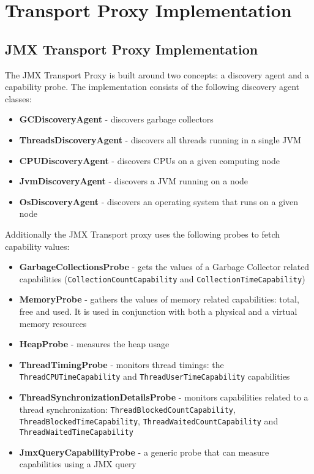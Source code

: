 \section{Transport Proxy Implementation}

\subsection{JMX Transport Proxy Implementation}

The JMX Transport Proxy is built around two concepts: a discovery agent and a capability probe. The implementation consists of the following discovery agent classes:

\begin{itemize} 
  \item{\bf{GCDiscoveryAgent}} - discovers garbage collectors 
  \item{\bf{ThreadsDiscoveryAgent}} - discovers all threads running in a single JVM
  \item{\bf{CPUDiscoveryAgent}} - discovers CPUs on a given computing node
  \item{\bf{JvmDiscoveryAgent}} - discovers a JVM running on a node
  \item{\bf{OsDiscoveryAgent}} - discovers an operating system that runs on a given node
\end{itemize} 

Additionally the JMX Transport proxy uses the following probes to fetch capability values: 

\begin{itemize} 
  \item{\bf{GarbageCollectionsProbe}} - gets the values of a Garbage Collector related capabilities (\texttt{CollectionCountCapability} and \texttt{CollectionTimeCapability})
  \item{\bf{MemoryProbe}} - gathers the values of memory related capabilities: total, free and used. It is used in conjunction with both a physical and a virtual memory resources
  \item{\bf{HeapProbe}} - measures the heap usage  
  \item{\bf{ThreadTimingProbe}} - monitors thread timings: the \texttt{ThreadCPUTimeCapability} and \texttt{ThreadUserTimeCapability} capabilities
  \item{\bf{ThreadSynchronizationDetailsProbe}} - monitors capabilities related to a thread synchronization: \texttt{ThreadBlockedCountCapability}, \texttt{ThreadBlockedTimeCapability}, \texttt{ThreadWaitedCountCapability} and \texttt{ThreadWaitedTimeCapability}
  \item{\bf{JmxQueryCapabilityProbe}} - a generic probe that can measure capabilities using a JMX query
\end{itemize} 


